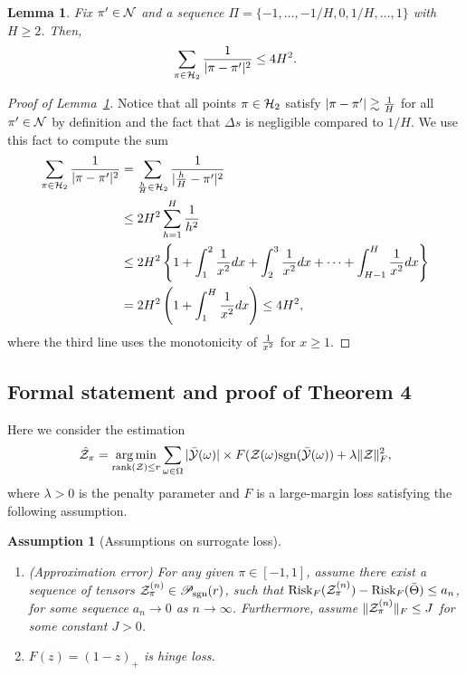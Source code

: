 \documentclass[11pt]{article}
\theoremstyle{plain}
\newtheorem{lem}{Lemma}[section]
\newtheorem{assumption}{Assumption}[section]
\theoremstyle{definition}
\def\sign{\textup{sgn}}
\def\caliP{\mathscr{P}_{\textup{sgn}}}
\def\risk{\textup{Risk}}
\begin{document}
\begin{lem}\label{lem:H}
Fix $\pi'\in\mathcal{N}$ and a sequence $\Pi=\{-1,\ldots,-1/H,0,1/H,\ldots,1\}$ with $H\geq 2$. Then, 
\[
\sum_{\pi \in \mathcal{H}_2}{1\over 
|\pi-\pi'|^2}\leq 4H^2. 
\]
\end{lem}
\begin{proof}[Proof of Lemma~\ref{lem:H}]
Notice that all points $\pi\in\mathcal{H}_2$ satisfy $|\pi-\pi'|\gtrsim{1\over H}$ for all $\pi'\in\mathcal{N}$ by definition and the fact that $\Delta s$ is negligible compared to $1/H$. We use this fact to compute the sum
\begin{align}
   \sum_{\pi \in \mathcal{H}_2}{1\over |\pi-\pi'|^2}&= \sum_{\frac{h}{H}\in\mathcal{H}_2 } {1\over |\frac{h}{H}-\pi'|^2}\\
   &\leq 2H^2\sum_{h=1}^{H}{1 \over h^2}\\
 &\leq 2H^2\left\{ 1+\int_{1}^2{1\over x^2}dx+ \int_{2}^3{1\over x^2}dx+\cdots + \int_{H-1}^H{1\over x^2}dx\right\}\\
&= 2H^2\left(1+\int^{H}_{1}{1\over x^2}dx\right) \leq 4H^2,
\end{align}
 where the third line uses the monotonicity of ${1\over x^2}$ for $x\geq 1$. 
 \end{proof}
 

\subsection{Formal statement  and proof of Theorem 4 }
 Here we consider the estimation 
 \begin{align}\label{eq:largemgopt}
  \hat\tZ_\pi = \argmin_{\text{rank}(\tZ)\leq r}\sum_{\omega\in\Omega} |\bar\tY(\omega)|\times F(\tZ(\omega)\sign(\bar \tY(\omega))+\lambda\FnormSize{}{\tZ}^2,
 \end{align}
 where $\lambda>0$ is the penalty parameter and $F$ is  a large-margin loss satisfying the following assumption.

\begin{assumption}[Assumptions on surrogate loss]\label{ass:main} \hfill
\begin{enumerate}
\item[(a)] (Approximation error) For any given $\pi\in[-1,1]$, assume there exist a sequence of tensors $\tZ^{(n)}_\pi\in\caliP(r)
$, such that $\risk_F(\tZ^{(n)}_\pi)-\risk_F(\bar\Theta)\leq a_n$, for some sequence $a_n\to 0$ as $n\to\infty$. Furthermore, assume $\lVert\mathcal{Z}_{\pi}^{(n)}\rVert_F \leq J$ for some constant $J>0$. 
\item[(b)]  $F(z)=(1-z)_{+}$ is hinge loss.
\end{enumerate}
\end{assumption}
\end{document}

